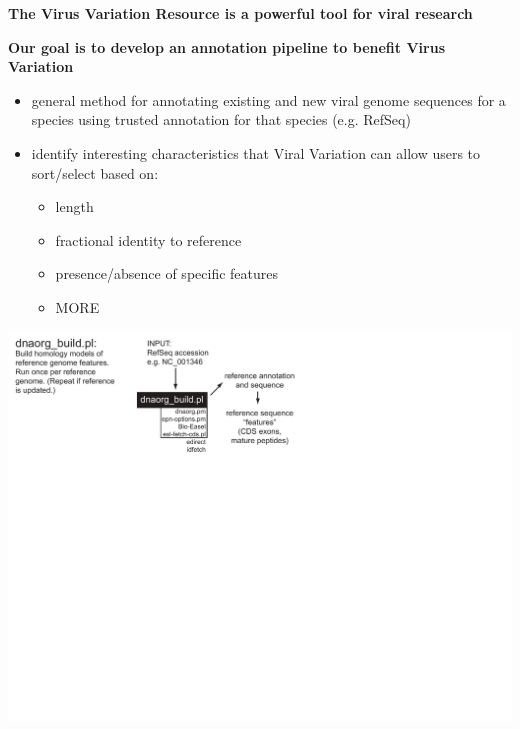 \documentclass[landscape]{slides}
\begin{document}
\begin{slide}
\textbf{The Virus Variation Resource is a powerful tool for viral research}

\vfill
\end{slide}
\begin{slide}
\begin{center}
\textbf{Our goal is to develop an annotation pipeline to benefit Virus Variation}

\small
\begin{itemize}
\item general method for annotating existing and new viral genome
  sequences for a species using trusted annotation for that species (e.g. RefSeq)
\item identify interesting characteristics that Viral Variation can
  allow users to sort/select based on:
\begin{itemize}
  \item length
  \item fractional identity to reference
  \item presence/absence of specific features
  \item MORE
\end{itemize}
\end{itemize}

\end{center}
\vfill
\end{slide}
\begin{slide}
\includegraphics[width=10in]{figs/dnaorg-scripts-build1}
\vfill
\end{slide}
\end{document}
